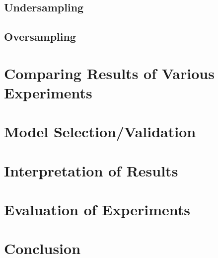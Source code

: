 \subsection{Undersampling}
\subsection{Oversampling}

\section{Comparing Results of Various Experiments}

\section{Model Selection/Validation}

\section{Interpretation of Results}

\section{Evaluation of Experiments}

\section{Conclusion}